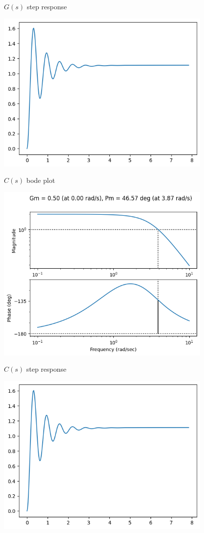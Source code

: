 \documentclass[11pt]{article}
\begin{document}
$G(s)$ step response

\includegraphics[width=300pt]{a5_6.png}

$C(s)$ bode plot

\includegraphics[width=300pt]{a5_7.png}

$C(s)$ step response

\includegraphics[width=300pt]{a5_8.png}
\end{document}
